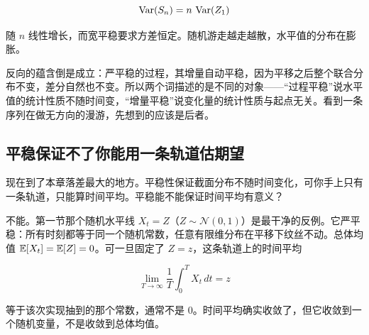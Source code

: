 \[
\operatorname{Var}(S_n) = n\,\operatorname{Var}(Z_1)
\]

随 \(n\) 线性增长，而宽平稳要求方差恒定。随机游走越走越散，水平值的分布在膨胀。

反向的蕴含倒是成立：严平稳的过程，其增量自动平稳，因为平移之后整个联合分布不变，差分自然也不变。所以两个词描述的是不同的对象——``过程平稳''说水平值的统计性质不随时间变，``增量平稳''说变化量的统计性质与起点无关。看到一条序列在做无方向的漫游，先想到的应该是后者。

\subsection{平稳保证不了你能用一条轨道估期望}

现在到了本章落差最大的地方。平稳性保证截面分布不随时间变化，可你手上只有一条轨道，只能算时间平均。平稳能不能保证时间平均有意义？

不能。第一节那个随机水平线 \(X_t = Z\)（\(Z\sim\mathcal N(0,1)\)）是最干净的反例。它严平稳：所有时刻都等于同一个随机常数，任意有限维分布在平移下纹丝不动。总体均值 \(\mathbb{E}[X_t]=\mathbb{E}[Z]=0\)。可一旦固定了 \(Z=z\)，这条轨道上的时间平均

\[
\lim_{T\to\infty} \frac{1}{T}\int_0^{T} X_t\,dt = z
\]

等于该次实现抽到的那个常数，通常不是 0。时间平均确实收敛了，但它收敛到一个随机变量，不是收敛到总体均值。

